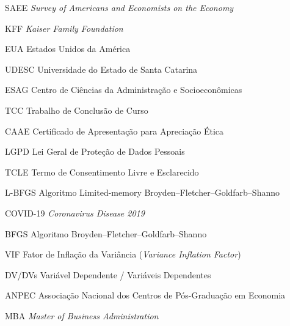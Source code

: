 
\listoffigures*
\cleardoublepage

\listofquadros*
\cleardoublepage


\listoftables*
\cleardoublepage

\begin{siglas}
    \item[SAEE] \textit{Survey of Americans and Economists on the Economy}
    \item[KFF] \textit{Kaiser Family Foundation}
    \item[EUA] Estados Unidos da América
    \item[UDESC] Universidade do Estado de Santa Catarina
    \item[ESAG] Centro de Ciências da Administração e Socioeconômicas
    \item[TCC] Trabalho de Conclusão de Curso
    \item[CAAE] Certificado de Apresentação para Apreciação Ética
    \item[LGPD] Lei Geral de Proteção de Dados Pessoais
    \item[TCLE] Termo de Consentimento Livre e Esclarecido
    \item[L-BFGS] Algoritmo Limited-memory Broyden–Fletcher–Goldfarb–Shanno
    \item[COVID-19] \textit{Coronavirus Disease 2019}
    \item[BFGS] Algoritmo Broyden–Fletcher–Goldfarb–Shanno
    \item[VIF] Fator de Inflação da Variância (\textit{Variance Inflation Factor})
    \item[DV/DVs] Variável Dependente / Variáveis Dependentes
    \item[ANPEC] Associação Nacional dos Centros de Pós-Graduação em Economia
    \item[MBA] \textit{Master of Business Administration}
\end{siglas}






